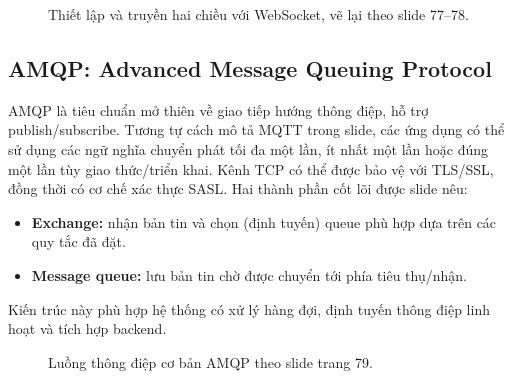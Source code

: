 \begin{figure}[htbp]\centering
{}
\caption{Thiết lập và truyền hai chiều với WebSocket, vẽ lại theo slide 77--78.}\end{figure}

\subsection{AMQP: Advanced Message Queuing Protocol}
AMQP là tiêu chuẩn mở thiên về giao tiếp hướng thông điệp, hỗ trợ publish/subscribe. Tương tự cách mô tả MQTT trong slide, các ứng dụng có thể sử dụng các ngữ nghĩa chuyển phát tối đa một lần, ít nhất một lần hoặc đúng một lần tùy giao thức/triển khai. Kênh TCP có thể được bảo vệ với TLS/SSL, đồng thời có cơ chế xác thực SASL. Hai thành phần cốt lõi được slide nêu:
\begin{itemize}
\item \textbf{Exchange:} nhận bản tin và chọn (định tuyến) queue phù hợp dựa trên các quy tắc đã đặt.
\item \textbf{Message queue:} lưu bản tin chờ được chuyển tới phía tiêu thụ/nhận.
\end{itemize}
Kiến trúc này phù hợp hệ thống có xử lý hàng đợi, định tuyến thông điệp linh hoạt và tích hợp backend. 

\begin{figure}[htbp]\centering
{}
\caption{Luồng thông điệp cơ bản AMQP theo slide trang 79.}\end{figure}

